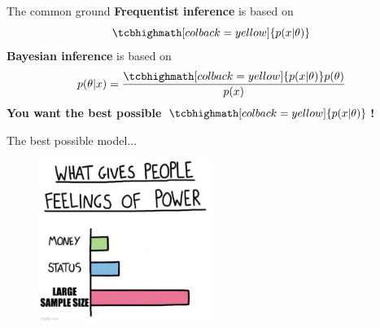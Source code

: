 \documentclass[
aspectratio=169,
14pt,
professionalfonts
]{beamer}
\newcommand{\arrow}{~\ding{220}~}
\begin{document}

\begin{frame}{The common ground}
    \textbf{Frequentist inference} is based on 
    $$\tcbhighmath[colback=yellow]{p(x|\theta)}$$
    \textbf{Bayesian inference} is based on
    $$p(\theta | x) = \frac{\tcbhighmath[colback=yellow]{p(x|\theta)} p(\theta)}{p(x)}$$
    \centering
    \Large
    \textbf{You want the best possible $\tcbhighmath[colback=yellow]{p(x|\theta)}$!}
\end{frame}

\begin{frame}[noframenumbering]{The best possible model...}
    \begin{figure}
        \includegraphics[width=0.5\textwidth]{../plots/sample_size.jpg}
    \end{figure}
\end{frame}
\end{document}
